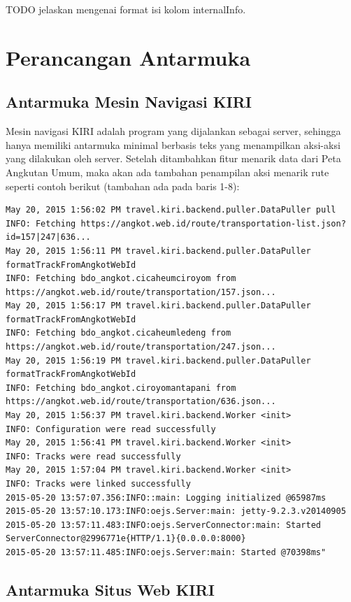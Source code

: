 TODO jelaskan mengenai format isi kolom internalInfo.

\section{Perancangan Antarmuka}

\subsection{Antarmuka Mesin Navigasi KIRI}

Mesin navigasi KIRI adalah program yang dijalankan sebagai server, sehingga hanya memiliki antarmuka minimal berbasis teks yang menampilkan aksi-aksi yang dilakukan oleh server. Setelah ditambahkan fitur menarik data dari Peta Angkutan Umum, maka akan ada tambahan penampilan aksi menarik rute seperti contoh berikut (tambahan ada pada baris 1-8):

\begin{lstlisting}
May 20, 2015 1:56:02 PM travel.kiri.backend.puller.DataPuller pull
INFO: Fetching https://angkot.web.id/route/transportation-list.json?id=157|247|636...
May 20, 2015 1:56:11 PM travel.kiri.backend.puller.DataPuller formatTrackFromAngkotWebId
INFO: Fetching bdo_angkot.cicaheumciroyom from https://angkot.web.id/route/transportation/157.json...
May 20, 2015 1:56:17 PM travel.kiri.backend.puller.DataPuller formatTrackFromAngkotWebId
INFO: Fetching bdo_angkot.cicaheumledeng from https://angkot.web.id/route/transportation/247.json...
May 20, 2015 1:56:19 PM travel.kiri.backend.puller.DataPuller formatTrackFromAngkotWebId
INFO: Fetching bdo_angkot.ciroyomantapani from https://angkot.web.id/route/transportation/636.json...
May 20, 2015 1:56:37 PM travel.kiri.backend.Worker <init>
INFO: Configuration were read successfully
May 20, 2015 1:56:41 PM travel.kiri.backend.Worker <init>
INFO: Tracks were read successfully
May 20, 2015 1:57:04 PM travel.kiri.backend.Worker <init>
INFO: Tracks were linked successfully
2015-05-20 13:57:07.356:INFO::main: Logging initialized @65987ms
2015-05-20 13:57:10.173:INFO:oejs.Server:main: jetty-9.2.3.v20140905
2015-05-20 13:57:11.483:INFO:oejs.ServerConnector:main: Started ServerConnector@2996771e{HTTP/1.1}{0.0.0.0:8000}
2015-05-20 13:57:11.485:INFO:oejs.Server:main: Started @70398ms"
\end{lstlisting}


\subsection{Antarmuka Situs Web KIRI}

